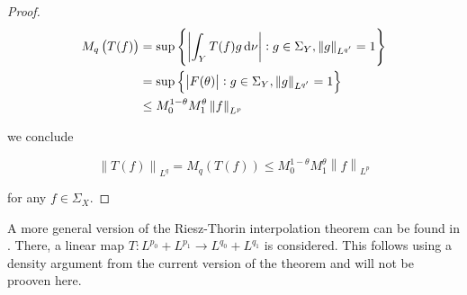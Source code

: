 \begin{proof}
\begin{gather*}
	\begin{aligned}
		M_q\left( T(f) \right) &= \sup\left\{\left| \int_Y T(f)g\mathop{}\!\mathrm{d}\nu\right| : g \in \Sigma_Y, \left\|g\right\|_{L^{q'}} = 1\right\}\\
		&=  \sup\left\{\left| F(\theta)\right| : g \in \Sigma_Y, \left\|g\right\|_{L^{q'}} = 1\right\}\\
		&\leq M_0^{1 - \theta}M_1^\theta \left\|f\right\|_{L^p}\\
	\end{aligned}
\end{gather*}

\noindent we conclude 
	
\begin{equation*}
	\left\| T(f)\right\|_{L^q} = M_q\left( T(f) \right) \leq M_0^{1 - \theta}M_1^\theta \left\|f\right\|_{L^p}
\end{equation*}
	
\noindent for any $f \in \Sigma_X$.
\end{proof}

\begin{remark}
	A more general version of the Riesz-Thorin interpolation theorem can be found in \textup{\cite[200--202]{folland:real_analysis:1999}}. There, a linear map $T: L^{p_0} + L^{p_1} \rightarrow L^{q_0} + L^{q_1}$ is considered. This follows using a density argument from the current version of the theorem and will not be prooven here.
	\label{rem:extension}
\end{remark}

